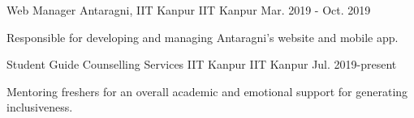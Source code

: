 \begin{cventries}
    
   \cventry
    {Web Manager} %
    {Antaragni, IIT Kanpur} %
    {IIT Kanpur} %
    {Mar. 2019 - Oct. 2019} %
    {
      \begin{cvitems} %
        \item {Responsible for developing and managing Antaragni’s website and mobile app.}
      \end{cvitems}
    }
    
    \cventry
    {Student Guide} %
    {Counselling Services IIT Kanpur} %
    {IIT Kanpur} %
    {Jul. 2019-present} %
    {
      \begin{cvitems} %
        \item {Mentoring freshers for an overall academic and emotional support for generating inclusiveness.}
      \end{cvitems}
    }

\end{cventries}

